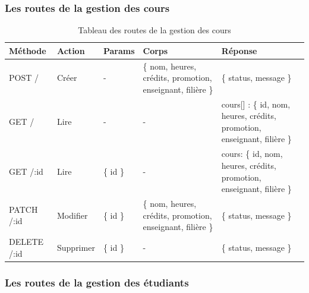 \subsubsection*{Les routes de la gestion des cours}\label{subsec:routes-course}

\begin{table}[ht]
  \caption{Tableau des routes de la gestion des cours}
  \label{tab:routes-course}
  \begin{tabular}{|p{1.5cm}|p{1.5cm}|p{1.5cm}|p{2.5cm}|p{3.5cm}|}
    \hline
      Méthode & Action & Params & Corps & Réponse \\
    \hline
      POST / & Créer &  - &  \{ nom, heures, crédits, promotion, enseignant, filière \} & \{ status, message \} \\
    \hline
        GET /  & Lire & - & - & cours[] :  \{ id, nom, heures, crédits, promotion, enseignant, filière \} \\
    \hline
        GET /:id & Lire & \{ id \} & - & cours: \{ id, nom, heures, crédits, promotion, enseignant, filière \} \\
    \hline
        PATCH /:id & Modifier  & \{ id \} &  \{ nom, heures, crédits, promotion, enseignant, filière \} & \{ status, message \} \\
    \hline
        DELETE /:id & Supprimer & \{ id \} & - & \{ status, message \} \\
    \hline
  \end{tabular}
\end{table}
\pagebreak

\subsubsection*{Les routes de la gestion des étudiants}\label{subsec:routes-student}

